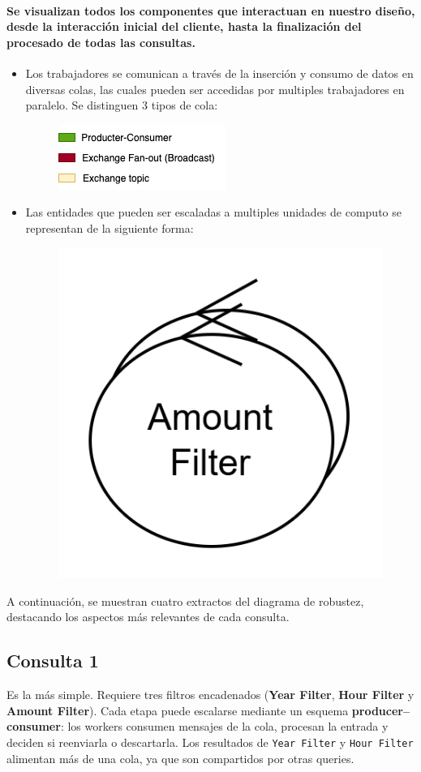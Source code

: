 \documentclass[titlepage,a4paper]{article}
\begin{document}
\paragraph{Se visualizan todos los componentes que interactuan en nuestro diseño, desde la interacción inicial del cliente, hasta la finalización del procesado de todas las consultas.}
\begin{itemize}
    \item Los trabajadores se comunican a través de la inserción y consumo de datos en diversas colas, las cuales pueden ser accedidas por multiples trabajadores en paralelo. Se distinguen 3 tipos de cola:
\begin{figure}[H]
\centering
    \includegraphics[width=0.45\linewidth]{colas.png}
\end{figure}

\end{itemize}
\begin{itemize}
    \item Las entidades que pueden ser escaladas a multiples unidades de computo se representan de la siguiente forma:
\begin{figure}[H]
\centering
    \includegraphics[width=0.15\linewidth]{multiple_computo.png}
\end{figure}
\end{itemize}

A continuación, se muestran cuatro extractos del diagrama de robustez, destacando los aspectos más relevantes de cada consulta.

\subsection*{Consulta 1}
Es la más simple. Requiere tres filtros encadenados (\textbf{Year Filter}, \textbf{Hour Filter} y \textbf{Amount Filter}).  
Cada etapa puede escalarse mediante un esquema \textbf{producer--consumer}: los workers consumen mensajes de la cola, procesan la entrada y deciden si reenviarla o descartarla.  
Los resultados de \texttt{Year Filter} y \texttt{Hour Filter} alimentan más de una cola, ya que son compartidos por otras queries.
\end{document}
